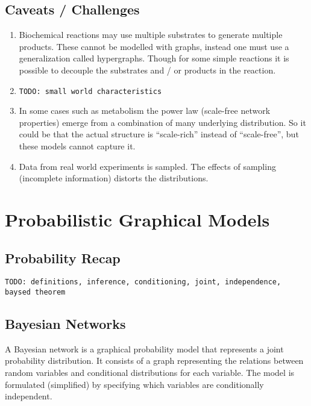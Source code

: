 \documentclass[a4paper]{article}
\newcommand{\todo}[1]{\texttt{TODO: #1}}
\theoremstyle{plain}
\theoremstyle{definition}
\theoremstyle{remark}
\begin{document}
\subsection{Caveats / Challenges}

\begin{enumerate}
  \item Biochemical reactions may use multiple substrates to generate multiple
    products. These cannot be modelled with graphs, instead one must use
    a generalization called hypergraphs. Though for some simple reactions it
    is possible to decouple the substrates and / or products in the reaction.

  \item \todo{small world characteristics}

  \item In some cases such as metabolism the power law (scale-free network
    properties) emerge from a combination of many underlying distribution. So
    it could be that the actual structure is ``scale-rich'' instead of
    ``scale-free'', but these models cannot capture it.

  \item Data from real world experiments is sampled. The effects of sampling
    (incomplete information) distorts the distributions.

\end{enumerate}


\section{Probabilistic Graphical Models}

\subsection{Probability Recap}

\todo{definitions, inference, conditioning, joint, independence, baysed
theorem}

\subsection{Bayesian Networks}

A Bayesian network is a graphical probability model that represents a joint
probability distribution. It consists of a graph representing the relations
between random variables and conditional distributions for each variable. The
model is formulated (simplified) by specifying which variables are
conditionally independent.
\end{document}
